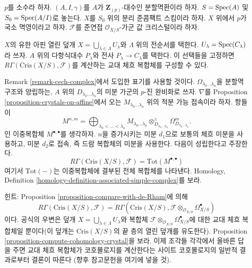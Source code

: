 \begin{remark}[교대 체흐 복합체]
\label{remark-alternating-cech-complex}
$p$를 소수라 하자. $(A, I, \gamma)$를 $A$가
$\mathbf{Z}_{(p)}$-대수인 분할멱환이라 하자. $S = \mathop{\mathrm{Spec}}(A)$ 및
$S_0 = \mathop{\mathrm{Spec}}(A/I)$로 놓는다. $X$를 $S_0$ 위의
분리 준콤팩트 스킴이라 하자. $X$ 위에서 $p$가 국소 멱영이라고
하자. $\mathcal{F}$를 준연접
$\mathcal{O}_{X/S}$-가군 값 크리스털이라 하자.

\medskip\noindent
$X$의 유한 아핀 열린 덮개
$X = \bigcup_{\lambda \in \Lambda} U_\lambda$와 $\Lambda$ 위의
전순서를 택한다. $U_\lambda = \mathop{\mathrm{Spec}}(C_\lambda)$라 쓰자.
$A$ 위의 다항식대수 $P_\lambda$와 전사
$P_\lambda \to C_\lambda$를 택한다. 이 선택들을 고정하면
$R\Gamma(\text{Cris}(X/S), \mathcal{F})$를 계산하는 교대 체흐
복합체를 구성할 수 있다.

\medskip\noindent
Remark \ref{remark-cech-complex}에서 도입한 표기를 사용할 것이다.
$\Omega_{\lambda_0 \ldots \lambda_n}$을 분할멱 구조와 양립하는,
$A$ 위의 $D_{\lambda_0 \ldots \lambda_n}$의 미분 가군의 $p$-진
완비화로 쓰자. $\nabla$를 Proposition
\ref{proposition-crystals-on-affine}에서 오는
$M_{\lambda_0 \ldots \lambda_n}$ 위의 적분 가능 접속이라 하자.
항들이
$$
M^{n, m} =
\bigoplus\nolimits_{\lambda_0 < \ldots < \lambda_n}
M_{\lambda_0 \ldots \lambda_n}
\otimes^\wedge_{D_{\lambda_0 \ldots \lambda_n}}
\Omega^m_{D_{\lambda_0 \ldots \lambda_n}}.
$$
인 이중복합체 $M^{\bullet, \bullet}$를 생각하자. $n$을 증가시키는
미분 $d_1$으로 보통의 체흐 미분을 사용하고, 미분 $d_2$로 접속,
즉 드람 복합체의 미분을 사용한다. 다음이 성립한다고 주장한다.
$$
R\Gamma(\text{Cris}(X/S), \mathcal{F}) = \text{Tot}(M^{\bullet, \bullet})
$$
여기서 $\text{Tot}(-)$는 이중복합체에 결부된 전체 복합체를
나타낸다. Homology, Definition
\ref{homology-definition-associated-simple-complex}를 보라.

\medskip\noindent
힌트: Proposition \ref{proposition-compare-with-de-Rham}에 의해
$$
R\Gamma(\text{Cris}(X/S), \mathcal{F}) = R\Gamma(\text{Cris}(X/S),
\mathcal{F} \otimes_{\mathcal{O}_{X/S}} \Omega_{X/S}^\bullet)
$$
이다. 공식의 우변은 덮개
$X = \bigcup_{\lambda \in \Lambda} U_\lambda$와 복합체
$\mathcal{F} \otimes_{\mathcal{O}_{X/S}} \Omega_{X/S}^\bullet$에 대한
교대 체흐 복합체일 뿐이다(이 덮개는 $\text{Cris}(X/S)$의 끝 층의
열린 덮개를 유도한다). Proposition
\ref{proposition-compute-cohomology-crystal}을 보라. 이제 조각들
각각에서 올바른 답을 주면 교대 체흐 복합체가 코호몰로지를
계산한다는 사이트 코호몰로지의 일반적 결과로부터 결론이 따른다
(향후 참고문헌을 여기에 넣을 것).
\end{remark}

